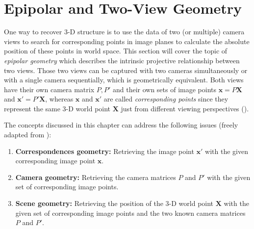 
\section{Epipolar and Two-View Geometry}
One way to recover 3-D structure is to use the data of two (or multiple) camera views to search for corresponding points in image planes to calculate the absolute position of these points in world space. This section will cover the topic of \textit{epipolar geometry} which describes the intrinsic projective relationship between two views. Those two views can be captured with two cameras simultaneously or with a single camera sequentially, which is geometrically equivalent. Both views have their own camera matrix $P,P'$ and their own sets of image points $\mathbf{x}=P\mathbf{X}$ and $\mathbf{x'}=P'\mathbf{X}$, whereas $\mathbf{x}$ and $\mathbf{x'}$ are called \textit{corresponding points} since they represent the same 3-D world point $\mathbf{X}$ just from different viewing perspectives (\cite[p.238]{Hartley.2011}).

The concepts discussed in this chapter can address the following issues (freely adapted from \cite[p.238]{Hartley.2011}):
\begin{enumerate}[i]
\item \textbf{Correspondences geometry:} Retrieving the image point $\mathbf{x'}$ with the given corresponding image point $\mathbf{x}$.
\item \textbf{Camera geometry:} Retrieving the camera matrices $P$ and $P'$ with the given set of corresponding image points. 
\item \textbf{Scene geometry:} Retrieving the position of the 3-D world point $\mathbf{X}$ with the given set of corresponding image points and the two known camera matrices $P$ and $P'$. 
\end{enumerate}

